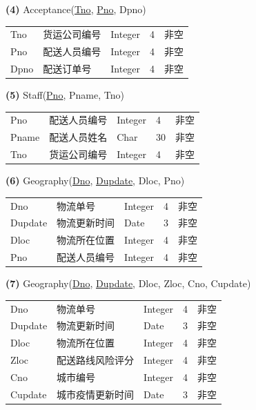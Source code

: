 \documentclass[12pt]{article}
\begin{document}
\vspace{0.5cm}
\noindent \textbf{(4)} Acceptance(\uline{Tno}, \uline{Pno}, Dpno)

\begin{center}
	\begin{tabular}{lllll}
		\toprule
		Tno &	货运公司编号 &	Integer &	4 &	非空 \\
		Pno &	配送人员编号 &	Integer &	4 &	非空 \\
		Dpno &	配送订单号 &	Integer &	4 &	非空 \\
		\bottomrule
	\end{tabular}
\end{center}

\vspace{0.5cm}
\noindent \textbf{(5)} Staff(\uline{Pno}, Pname, Tno)

\begin{center}
	\begin{tabular}{lllll}
		\toprule
		Pno &	配送人员编号 &	Integer &	4 &	非空 \\
		Pname &	配送人员姓名 &	Char &	30 &	非空 \\
		Tno &	货运公司编号 &	Integer &	4 &	非空 \\
		\bottomrule
	\end{tabular}
\end{center}

\vspace{0.5cm}
\noindent \textbf{(6)} Geography(\uline{Dno}, \uline{Dupdate}, Dloc, Pno)

\begin{center}
	\begin{tabular}{lllll}
		\toprule
		Dno &	物流单号 &	Integer &	4 &	非空 \\
		Dupdate &	物流更新时间 &	Date &	3 &	非空 \\
		Dloc &	物流所在位置 &	Integer &	4 &	非空 \\
		Pno &	配送人员编号 &	Integer &	4 &	非空 \\
		\bottomrule
	\end{tabular}
\end{center}

\vspace{0.5cm}
\noindent \textbf{(7)} Geography(\uline{Dno}, \uline{Dupdate}, Dloc, Zloc, Cno, Cupdate)

\begin{center}
	\begin{tabular}{lllll}
		\toprule
		Dno &	物流单号 &	Integer &	4 &	非空 \\
		Dupdate &	物流更新时间 &	Date &	3 &	非空 \\
		Dloc &	物流所在位置 &	Integer &	4 &	非空 \\
		Zloc &	配送路线风险评分 &	Integer &	4 &	非空 \\
		Cno &	城市编号 &	Integer &	4 &	非空 \\
		Cupdate &	城市疫情更新时间 &	Date &	3 &	非空 \\
		\bottomrule
	\end{tabular}
\end{center}
\end{document}
